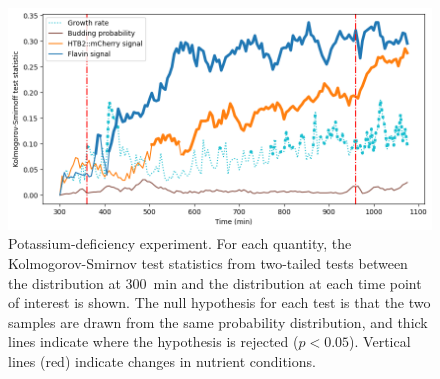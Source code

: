 \begin{figure}
  \centering
  \includegraphics[width=\textwidth]{613_ks_highlight}
  \caption{
    Potassium-deficiency experiment.
    For each quantity, the Kolmogorov-Smirnov test statistics from two-tailed tests between the distribution at \SI{300}{\minute} and the distribution at each time point of interest is shown.
    The null hypothesis for each test is that the two samples are drawn from the same probability distribution, and thick lines indicate where the hypothesis is rejected ($p < 0.05$).
    Vertical lines (red) indicate changes in nutrient conditions.
  }
  \label{fig:biology-kdeficient-ks}
\end{figure}


